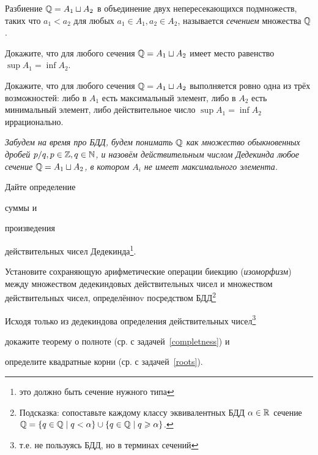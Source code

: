 \documentclass[a4paper, 12pt, num=27]{listok}
\begin{document}
\begin{definition}
	Разбиение $\mathbb{Q} = A_1 \sqcup A_2$ в объединение двух непересекающихся подмножеств,
	таких что $a_1 < a_2$ для любых $a_1 \in A_1, a_2 \in A_2$, называется \textit{сечением} множества $\mathbb{Q}$.
\end{definition}
\begin{problem}
	Докажите, что для любого сечения $\mathbb{Q} = A_1 \sqcup A_2$ имеет место равенство $\sup A_1 = \inf A_2$.
\end{problem}
\begin{problem}
	Докажите, что для любого сечения $\mathbb{Q} = A_1 \sqcup A_2$ выполняется ровно одна из трёх возможностей:
	либо в $A_1$ есть максимальный элемент, либо в $A_2$ есть минимальный элемент,
	либо действительное число $\sup A_1 = \inf A_2$ иррационально.
\end{problem}

\textit{%
	Забудем на время про БДД, будем понимать $\mathbb{Q}$ как множество обыкновенных дробей
	$p/q, p \in \mathbb{Z}, q \in \mathbb{N}$, и назовём действительным числом Дедекинда любое сечение
	$\mathbb{Q} = A_1 \sqcup A_2$, в котором $A_i$ не имеет максимального элемента.
}

\begin{problem}
	Дайте определение
	\begin{probparts}
		\item суммы и
		\item произведения
	\end{probparts}
	действительных чисел Дедекинда\footnote{это должно быть сечение нужного типа}.
\end{problem}
\begin{problem}
	Установите сохраняющую арифметические операции биекцию (\textit{изоморфизм}) между множеством
	дедекиндовых действительных чисел и множеством действительных чисел, определённоv посредством БДД\footnote{%
	Подсказка: сопоставьте каждому классу эквивалентных БДД $\alpha \in \mathbb{R}$ сечение
	$\mathbb{Q} = \{ q \in \mathbb{Q} \mid q < \alpha \} \cup \{ q \in \mathbb{Q} \mid q \geqslant \alpha \}$.}
\end{problem}
\begin{problem}
	Исходя только из дедекиндова определения действительных чисел\footnote{т.е. не пользуясь БДД, но в терминах сечений}
	\begin{probparts}
		\item докажите теорему о полноте (ср. с задачей~\ref{completness}) и
		\item определите квадратные корни (ср. с задачей~\ref{roots}).
	\end{probparts}
\end{problem}
\end{document}
